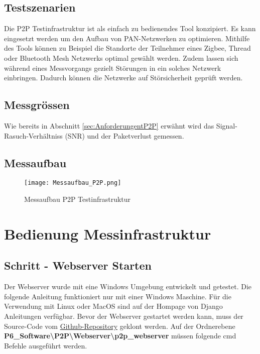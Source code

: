 \subsection{Testszenarien}\label{sec:TestszenarienP2P}

Die P2P Testinfrastruktur ist als einfach zu bedienendes Tool konzipiert. Es kann eingesetzt werden um den Aufbau von PAN-Netzwerken zu optimieren. Mithilfe des Tools können zu Beispiel die Standorte der Teilnehmer eines Zigbee, Thread oder Bluetooth Mesh Netzwerks optimal gewählt werden. Zudem lassen sich während eines Messvorgangs gezielt Störungen in ein solches Netzwerk einbringen. Dadurch können die Netzwerke auf Störsicherheit geprüft werden. 



\subsection{Messgrössen}\label{sec:MessgrössenP2P}

Wie bereits in Abschnitt \ref{sec:AnforderungentP2P} erwähnt wird das Signal-Rasuch-Verhältniss (SNR) und der Paketverlust gemessen. 

\subsection{Messaufbau}\label{sec:Messaufbau}

\begin{figure} [H]
	\centering
	\texttt{[image: Messaufbau\_P2P.png]}
	\caption{Messaufbau P2P Testinfrastruktur}
	\label{fig:MessaufbauP2P}
\end{figure}



\newpage
\section{Bedienung Messinfrastruktur}\label{sec:BedienungMessinfrastruktur}


\subsection{Schritt - Webserver Starten}\label{sec:SchrittWebserverStarten}
Der Webserver wurde mit eine Windows Umgebung entwickelt und getestet. Die folgende Anleitung funktioniert nur mit einer Windows Maschine. Für die Verwendung mit Linux oder MacOS sind auf der Hompage von Django Anleitungen verfügbar.
Bevor der Webserver gestartet werden kann, muss der Source-Code vom \href{https://github.com/Rouben94/P6_Software}{Github-Repository\footnotemark[\value{footnote}]} geklont werden. Auf der Ordnerebene \textbf{P6\_Software\textbackslash P2P\textbackslash Webserver\textbackslash p2p\_webserver} müssen folgende cmd Befehle ausgeführt werden.

